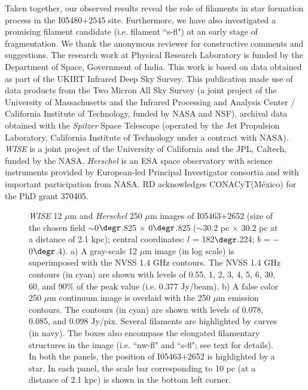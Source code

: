 \documentclass[iop]{emulateapj}
\begin{document}
Taken together, our observed results reveal the role of filaments in star formation process in the I05480+2545 site. 
Furthermore, we have also investigated a promising filament candidate (i.e. filament ``s-fl") at an early stage of fragmentation. 
%
\acknowledgments 
%
We thank the anonymous reviewer for constructive comments and suggestions. 
The research work at Physical Research Laboratory is funded by the Department of Space, Government of India. 
This work is based on data obtained as part of the UKIRT Infrared Deep Sky Survey. This publication 
made use of data products from the Two Micron All Sky Survey (a joint project of the University of Massachusetts and 
the Infrared Processing and Analysis Center / California Institute of Technology, funded by NASA and NSF), archival 
data obtained with the {\it Spitzer} Space Telescope (operated by the Jet Propulsion Laboratory, California Institute 
of Technology under a contract with NASA). {\it WISE} is a joint project of the
University of California and the JPL, Caltech, funded by the NASA. {\it Herschel} is an ESA space observatory with science instruments provided by European-led Principal Investigator consortia and with important participation from NASA. RD acknowledges CONACyT(M\'{e}xico) for the PhD grant 370405. 
%
%
\begin{figure*}
\caption{\scriptsize {\it WISE} 12 $\mu$m and {\it Herschel} 250 $\mu$m images of I05463+2652 (size of the chosen field $\sim$0$\degr$.825 $\times$ 0$\degr$.825 
($\sim$30.2 pc $\times$ 30.2 pc at a distance of 2.1 kpc); 
central coordinates: $l$ = 182$\degr$.224; $b$ = $-$0$\degr$.4). 
a) A gray-scale 12 $\mu$m image (in log scale) is superimposed with the NVSS 1.4 GHz contours. 
The NVSS 1.4 GHz contours (in cyan) are shown with levels of 0.55, 1, 2, 3, 4, 5, 6, 30, 60, and 90\% of the peak value (i.e.  0.377 Jy/beam).
b) A false color 250 $\mu$m continuum image is overlaid with the 250 $\mu$m emission contours. 
The contours (in cyan) are shown with levels of 0.078, 0.085, and 0.098 Jy/pix. 
Several filaments are highlighted by curves (in navy). The boxes also encompass the elongated filamentary structures in the image (i.e. ``nw-fl" and ``s-fl"; see text for details). 
In both the panels, the position of I05463+2652 is highlighted by a star.
In each panel, the scale bar corresponding to 10 pc (at a distance of 2.1 kpc) is shown in the bottom left corner.}
\label{fig1}
\end{figure*}
%
\end{document}
